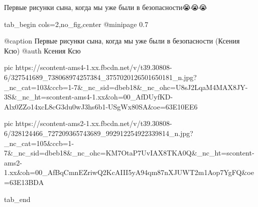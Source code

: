  
 
 
 
 

\begin{center}
\begin{minipage}{\textwidth}

Первые рисунки сына, когда мы уже были в безопасности😭😭😭

\ifcmt
  tab_begin cols=2,no_fig,center
     @minipage 0.7

     @caption Первые рисунки сына, когда мы уже были в безопасности (Ксения Ксю)
     @auth Ксения Ксю

     pic https://scontent-ams4-1.xx.fbcdn.net/v/t39.30808-6/327541689_738068974257384_3757020126501650181_n.jpg?_nc_cat=103&ccb=1-7&_nc_sid=dbeb18&_nc_ohc=U8sJ2LqaM4MAX8JY-3S&_nc_ht=scontent-ams4-1.xx&oh=00_AfDUyfKD-Alx0ZZo14xcL8cG3du0wJ3hs6b1-USgWx80SA&oe=63E10EE6

     pic https://scontent-ams2-1.xx.fbcdn.net/v/t39.30808-6/328124466_727209365743689_992912254922339814_n.jpg?_nc_cat=105&ccb=1-7&_nc_sid=dbeb18&_nc_ohc=KM7OtaP7UvIAX8TKA0Q&_nc_ht=scontent-ams2-1.xx&oh=00_AfBqCmnEZriwQ2KcAIII5yA94qm87nXJUWT2m1Aop7YgFQ&oe=63E13BDA

  tab_end
\fi
\end{minipage}
\end{center}
